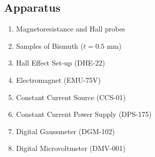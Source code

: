 \subsection*{Apparatus}

\begin{enumerate}
    \item Magnetoresistance and Hall probes
    \item Samples of Bismuth ($t = 0.5$ mm)
    \item Hall Effect Set-up (DHE-22)
    \item Electromagnet (EMU-75V)
    \item Constant Current Source (CCS-01)
    \item Constant Current Power Supply (DPS-175)
    \item Digital Gaussmeter (DGM-102)
    \item Digital Microvoltmeter (DMV-001)
\end{enumerate}
